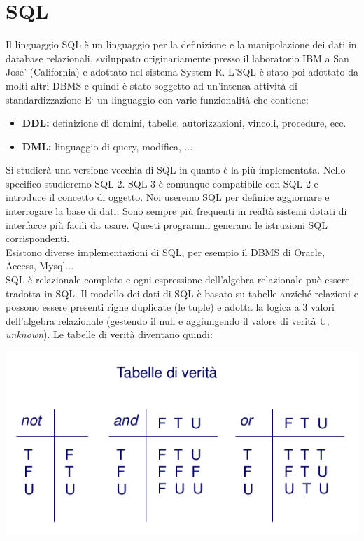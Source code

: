 \documentclass[a4paper,12pt, oneside]{book}
\begin{document}
\begin{itemize}
\end{itemize}

\chapter{SQL}
Il linguaggio SQL è un linguaggio per la definizione e la manipolazione dei dati in database relazionali, sviluppato originariamente presso il laboratorio IBM a San Jose’ (California) e adottato nel sistema System R.
L’SQL è stato poi adottato da molti altri DBMS e quindi è stato soggetto ad un’intensa attività di standardizzazione
E‘ un linguaggio con varie funzionalità che contiene:
\begin{itemize}
\item \textbf{DDL:} definizione di domini, tabelle, autorizzazioni, vincoli,
procedure, ecc.
\item \textbf{DML:} linguaggio di query, modifica, ...
\end{itemize}
Si studierà una versione vecchia di SQL in quanto è la più implementata. Nello specifico studieremo SQL-2. SQL-3 è comunque compatibile con SQL-2 e introduce il concetto di oggetto. Noi useremo SQL per definire aggiornare e interrogare la base di dati. Sono sempre più frequenti in realtà sistemi dotati di interfacce più facili da usare. Questi programmi generano le istruzioni SQL corrispondenti.\\
Esistono diverse implementazioni di SQL, per esempio il DBMS di Oracle, Access, Mysql...\\
SQL è relazionale completo e ogni espressione dell'algebra relazionale può essere tradotta in SQL. Il modello dei dati di SQL è basato su tabelle anziché relazioni e possono essere presenti righe duplicate (le tuple) e adotta la logica a 3 valori dell'algebra relazionale (gestendo il null e aggiungendo il valore di verità U, \textit{unknown}). 
\newpage 
Le tabelle di verità diventano quindi:
\begin{center}
	\includegraphics[scale=0.7]{img/unk.png}
\end{center}
\end{document}
